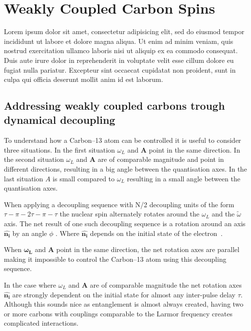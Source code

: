 
\chapter{Weakly Coupled Carbon Spins}
Lorem ipsum dolor sit amet, consectetur adipisicing elit, sed do eiusmod
tempor incididunt ut labore et dolore magna aliqua. Ut enim ad minim veniam,
quis nostrud exercitation ullamco laboris nisi ut aliquip ex ea commodo
consequat. Duis aute irure dolor in reprehenderit in voluptate velit esse
cillum dolore eu fugiat nulla pariatur. Excepteur sint occaecat cupidatat non
proident, sunt in culpa qui officia deserunt mollit anim id est laborum.

\section{Addressing weakly coupled carbons trough dynamical decoupling}
\label{controllingacarbonthroughdynamicaldecoupling}
To understand how a Carbon--13 atom can be controlled it is useful to consider three situations. In the first situation $\omega_L$ and $\mathbf{A}$ point in the same direction. In the second situation $\omega_L$ and $\mathbf{A}$ are of comparable magnitude and point in different directions, resulting in a big angle between the quantisation axes. In the last situation $A$ is small compared to  $\omega_L$ resulting in a small angle between the quantisation axes.

When applying a decoupling sequence with N\slash 2 decoupling units of the form \mbox{$\tau - \pi -2\tau-\pi-\tau$} the nuclear spin alternately rotates around the  $\omega_L$ and the $\tilde{\omega}$ axis. The net result of one such decoupling sequence is a rotation around an axis  $\mathbf{\hat{n_i}}$ by an angle $\phi$  . Where  $\mathbf{\hat{n_i}}$  depends on the initial state of the electron~\citep{Taminiau2012Detection}.

When $\mathbf{\omega_L}$ and $\mathbf{A}$ point in the same direction, the net rotation axes are parallel making it impossible to control the Carbon--13 atom using this decoupling sequence.

In the case where $\omega_L$ and $\mathbf{A}$ are of comparable magnitude the net rotation axes  $\mathbf{\hat{n_i}}$ are strongly dependent on the initial state for almost any inter-pulse delay $\tau$. Although this sounds nice as entanglement is almost always created, having two or more carbons with couplings comparable to the Larmor frequency creates complicated interactions.


